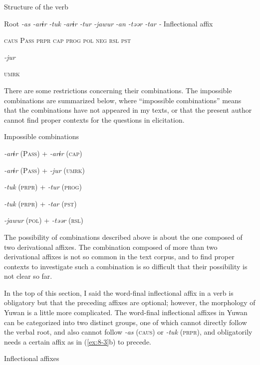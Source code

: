 \ea\label{ex:8-1}
  Structure of the verb

  Root  \textit{{}-as  {}-arɨr} %
\textit{{}-tuk  {}-arɨr  {}-tur  {}-jawur} %
\textit{{}-an  {}-təər  {}-tar  {}-} Inflectional affix

    \textsc{caus}  P\textsc{ass}  \textsc{prpr}  \textsc{cap}  \textsc{prog}  \textsc{pol}  \textsc{neg}  \textsc{rsl}  \textsc{pst}

          \textit{{}-jur} 

          \textsc{umrk}

There are some restrictions concerning their combinations. The impossible combinations are summarized below, where “impossible combinations” means that the combinations have not appeared in my texts, or that the present author cannot find proper contexts for the questions in elicitation.

\ea\label{ex:8-2}
  Impossible combinations

\ea *\textit{{}-arɨr} (P\textsc{ass})   +  \textit{{}-arɨr} (\textsc{cap})

\ex *\textit{{}-arɨr} (P\textsc{ass})   +  \textit{{}-jur} (\textsc{umrk})

\ex *\textit{{}-tuk} (\textsc{prpr})  +  \textit{{}-tur} (\textsc{prog})

\ex *\textit{{}-tuk} (\textsc{prpr})  +  \textit{{}-tar} (\textsc{pst})

\ex *\textit{{}-jawur} (\textsc{pol})  +  \textit{{}-təər} (\textsc{rsl})

The possibility of combinations described above is about the one composed of two derivational affixes. The combination composed of more than two derivational affixes is not so common in the text corpus, and to find proper contexts to investigate such a combination is so difficult that their possibility is not clear so far.

  In the top of this section, I said the word-final inflectional affix in a verb is obligatory but that the preceding affixes are optional; however, the morphology of Yuwan is a little more complicated. The word-final inflectional affixes in Yuwan can be categorized into two distinct groups, one of which cannot directly follow the verbal root, and also cannot follow \textit{{}-as} (\textsc{caus}) or \textit{{}-tuk} (\textsc{prpr}), and obligatorily needs a certain affix as in (\ref{ex:8-3}b) to precede.

\ea\label{ex:8-3}
  Inflectional affixes

